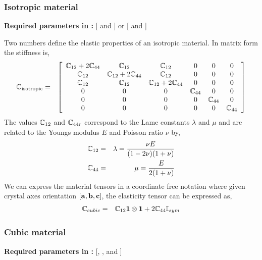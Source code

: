 \subsubsection{Isotropic material}
\begin{flushleft}
  \textbf{Required parameters in :}
  [ and ] or [ and ]
\end{flushleft}

Two numbers define the elastic properties of an isotropic material.
In matrix form the stiffness is,
\begin{eqnarray}
\mathbb{C}_\text{isotropic} &=&
\left[
\begin{array}{cccccc}
\mathbb{C}_{12}+2\mathbb{C}_{44}  & \mathbb{C}_{12}  &  \mathbb{C}_{12}  &   0   &   0    &  0    \\
\mathbb{C}_{12}  & \mathbb{C}_{12}+2\mathbb{C}_{44} &  \mathbb{C}_{12}  &   0   &   0    &  0    \\
\mathbb{C}_{12}  & \mathbb{C}_{12}  &  \mathbb{C}_{12}+2\mathbb{C}_{44} &   0   &   0    &  0    \\
    0   &     0   &      0   & \mathbb{C}_{44} & 0 & 0 \\
    0   &     0   &      0   &   0   & \mathbb{C}_{44} &  0    \\
    0   &     0   &      0   &   0   &   0    & \mathbb{C}_{44}
\end{array}
\right] 
\end{eqnarray}
The values $\mathbb{C}_{12}$ and $\mathbb{C}_{44r}$ correspond to the Lame
constants $\lambda$ and $\mu$ and are related to the Youngs modulus
$E$ and Poisson ratio $\nu$ by,
\begin{eqnarray}
\mathbb{C}_{12} &=& \lambda = \frac{\nu E}{(1-2\nu)(1+\nu)} \\
\mathbb{C}_{44} &=& \mu     = \frac{E}{2(1+\nu)}
\end{eqnarray}
We can express the material tensors in a coordinate free notation
where given crystal
axes orientation $[\mathbf{a},\mathbf{b},\mathbf{c}]$, the elasticity tensor can be
expressed as,
\begin{eqnarray}
\mathbb{C}_{cubic} &=&  \mathbb{C}_{12}\mathbf{1}\otimes\mathbf{1}
                +2\mathbb{C}_{44}\mathbb{I}_{sym}  \nonumber
\end{eqnarray}

\subsubsection{Cubic material}
\begin{flushleft}
  \textbf{Required parameters in :}
  [, , and ]
\end{flushleft}

